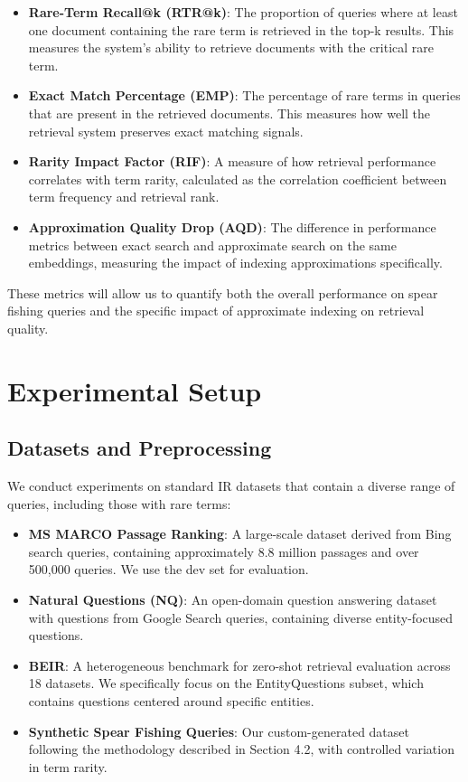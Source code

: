 \documentclass[sigconf,review]{acmart}
\begin{document}
\begin{itemize}
\item \textbf{Rare-Term Recall@k (RTR@k)}: The proportion of queries where at least one document containing the rare term is retrieved in the top-k results. This measures the system's ability to retrieve documents with the critical rare term.

\item \textbf{Exact Match Percentage (EMP)}: The percentage of rare terms in queries that are present in the retrieved documents. This measures how well the retrieval system preserves exact matching signals.

\item \textbf{Rarity Impact Factor (RIF)}: A measure of how retrieval performance correlates with term rarity, calculated as the correlation coefficient between term frequency and retrieval rank.

\item \textbf{Approximation Quality Drop (AQD)}: The difference in performance metrics between exact search and approximate search on the same embeddings, measuring the impact of indexing approximations specifically.
\end{itemize}

These metrics will allow us to quantify both the overall performance on spear fishing queries and the specific impact of approximate indexing on retrieval quality.

\section{Experimental Setup}
\subsection{Datasets and Preprocessing}
We conduct experiments on standard IR datasets that contain a diverse range of queries, including those with rare terms:

\begin{itemize}
\item \textbf{MS MARCO Passage Ranking}: A large-scale dataset derived from Bing search queries, containing approximately 8.8 million passages and over 500,000 queries. We use the dev set for evaluation.

\item \textbf{Natural Questions (NQ)}: An open-domain question answering dataset with questions from Google Search queries, containing diverse entity-focused questions.

\item \textbf{BEIR}: A heterogeneous benchmark for zero-shot retrieval evaluation across 18 datasets. We specifically focus on the EntityQuestions \cite{sciavolino2021entityquestions} subset, which contains questions centered around specific entities.

\item \textbf{Synthetic Spear Fishing Queries}: Our custom-generated dataset following the methodology described in Section 4.2, with controlled variation in term rarity.
\end{itemize}
\end{document}
